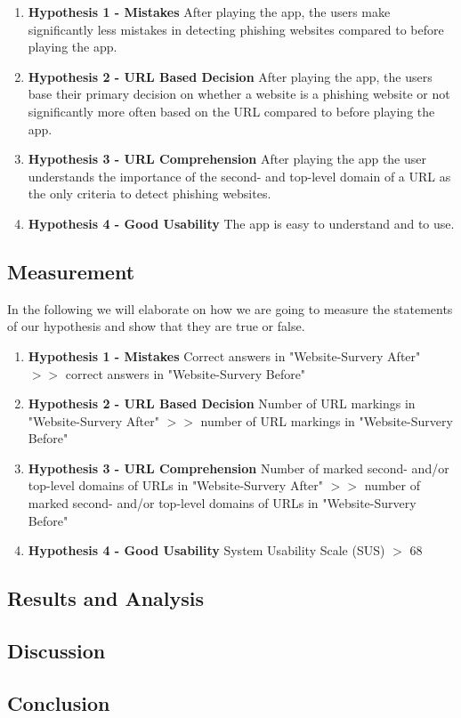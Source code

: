 \begin{enumerate}
	\item \textbf{Hypothesis 1 - Mistakes} After playing the app, the users make significantly less mistakes in detecting phishing websites compared to before playing the app.
	\item \textbf{Hypothesis 2 - URL Based Decision} After playing the app, the users base their primary decision on whether a website is a phishing website or not significantly more often based on the URL compared to before playing the app.
	\item \textbf{Hypothesis 3 - URL Comprehension} After playing the app the user understands the importance of the second- and top-level domain of a URL as the only criteria to detect phishing websites.
	\item \textbf{Hypothesis 4 - Good Usability} The app is easy to understand and to use.
\end{enumerate}


\subsection{Measurement}
In the following we will elaborate on how we are going to measure the statements of our hypothesis and show that they are true or false.

\begin{enumerate}
	\item \textbf{Hypothesis 1 - Mistakes} Correct answers in "Website-Survery After" $>>$ correct answers in "Website-Survery Before" 
	\item \textbf{Hypothesis 2 - URL Based Decision} Number of URL markings in "Website-Survery After" $>>$ number of URL markings in "Website-Survery Before" 
	\item \textbf{Hypothesis 3 - URL Comprehension} Number of marked second- and/or top-level domains of URLs in "Website-Survery After"  $>>$ number of marked second- and/or top-level domains of URLs in "Website-Survery Before" 
	\item \textbf{Hypothesis 4 - Good Usability} System Usability Scale (SUS) $>$ 68
\end{enumerate}

\subsection{Results and Analysis}
\subsection{Discussion}
\subsection{Conclusion}
